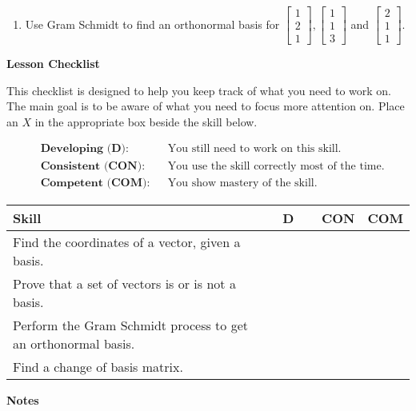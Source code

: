 \documentclass[10pt]{book}
\theoremstyle{definition}
\theoremstyle{remark}
\begin{document}
\begin{large}
\begin{enumerate}
\item Use Gram Schmidt to find an orthonormal basis for  $\begin{bmatrix} 1 \\ 2 \\ 1 \end{bmatrix}, \begin{bmatrix} 1 \\ 1 \\ 3 \end{bmatrix}$ and $\begin{bmatrix}2 \\ 1 \\ 1 \end{bmatrix}$.\vfil
\end{enumerate}

\noindent
\textbf{Lesson Checklist}
\bigskip

\noindent
This checklist is designed to help you keep track of what you need to work on. The main goal is to be aware of what you need to focus more attention on. Place an $X$ in the appropriate box beside the skill below. 
\bigskip

\noindent
\begin{align*}
&\textbf{Developing (D):} &&\textrm{You still need to work on this skill.}\\
&\textbf{Consistent (CON):} &&\textrm{You use the skill correctly most of the time.}\\
&\textbf{Competent (COM):} &&\textrm{You show mastery of the skill.} 
\end{align*}
\vfil

\begin{center}
\begin{tabular}{|l|l|l|l|}
\hline
\textbf{Skill} & \textbf{~~D~~} & \textbf{CON} & \textbf{COM} \\
\hline
Find the coordinates of a vector, given a basis.&&&\\
\hline
Prove that a set of vectors is or is not a basis.&&&\\
\hline
Perform the Gram Schmidt process to get an orthonormal basis.&&&\\
\hline
Find a change of basis matrix.&&&\\
\hline
\end{tabular}
\end{center}
 \vfil

\noindent
\textbf{Notes}
\end{large} \vfil
\newpage

\end{document}
